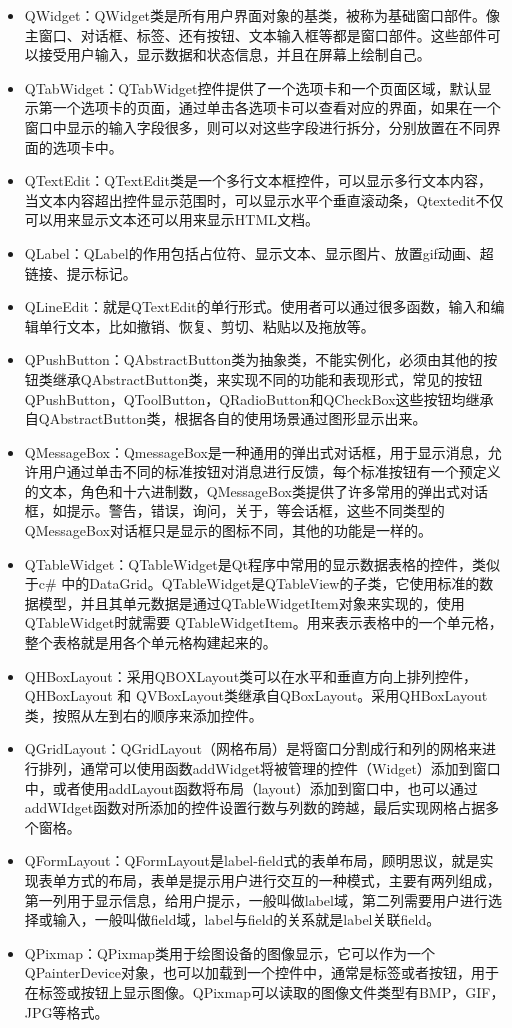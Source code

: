 \documentclass[cn,11pt,chinese]{elegantbook}
\begin{document}
\begin{itemize}
\item QWidget：QWidget类是所有用户界面对象的基类，被称为基础窗口部件。像主窗口、对话框、标签、还有按钮、文本输入框等都是窗口部件。这些部件可以接受用户输入，显示数据和状态信息，并且在屏幕上绘制自己。
\item QTabWidget：QTabWidget控件提供了一个选项卡和一个页面区域，默认显示第一个选项卡的页面，通过单击各选项卡可以查看对应的界面，如果在一个窗口中显示的输入字段很多，则可以对这些字段进行拆分，分别放置在不同界面的选项卡中。
\item QTextEdit：QTextEdit类是一个多行文本框控件，可以显示多行文本内容，当文本内容超出控件显示范围时，可以显示水平个垂直滚动条，Qtextedit不仅可以用来显示文本还可以用来显示HTML文档。
\item QLabel：QLabel的作用包括占位符、显示文本、显示图片、放置gif动画、超链接、提示标记。
\item QLineEdit：就是QTextEdit的单行形式。使用者可以通过很多函数，输入和编辑单行文本，比如撤销、恢复、剪切、粘贴以及拖放等。
\item QPushButton：QAbstractButton类为抽象类，不能实例化，必须由其他的按钮类继承QAbstractButton类，来实现不同的功能和表现形式，常见的按钮QPushButton，QToolButton，QRadioButton和QCheckBox这些按钮均继承自QAbstractButton类，根据各自的使用场景通过图形显示出来。
\item QMessageBox：QmessageBox是一种通用的弹出式对话框，用于显示消息，允许用户通过单击不同的标准按钮对消息进行反馈，每个标准按钮有一个预定义的文本，角色和十六进制数，QMessageBox类提供了许多常用的弹出式对话框，如提示。警告，错误，询问，关于，等会话框，这些不同类型的QMessageBox对话框只是显示的图标不同，其他的功能是一样的。
\item QTableWidget：QTableWidget是Qt程序中常用的显示数据表格的控件，类似于c\# 中的DataGrid。QTableWidget是QTableView的子类，它使用标准的数据模型，并且其单元数据是通过QTableWidgetItem对象来实现的，使用QTableWidget时就需要 QTableWidgetItem。用来表示表格中的一个单元格，整个表格就是用各个单元格构建起来的。
\item QHBoxLayout：采用QBOXLayout类可以在水平和垂直方向上排列控件，QHBoxLayout 和 QVBoxLayout类继承自QBoxLayout。采用QHBoxLayout类，按照从左到右的顺序来添加控件。
\item QGridLayout：QGridLayout（网格布局）是将窗口分割成行和列的网格来进行排列，通常可以使用函数addWidget将被管理的控件（Widget）添加到窗口中，或者使用addLayout函数将布局（layout）添加到窗口中，也可以通过addWIdget函数对所添加的控件设置行数与列数的跨越，最后实现网格占据多个窗格。
\item QFormLayout：QFormLayout是label-field式的表单布局，顾明思议，就是实现表单方式的布局，表单是提示用户进行交互的一种模式，主要有两列组成，第一列用于显示信息，给用户提示，一般叫做label域，第二列需要用户进行选择或输入，一般叫做field域，label与field的关系就是label关联field。
\item QPixmap：QPixmap类用于绘图设备的图像显示，它可以作为一个QPainterDevice对象，也可以加载到一个控件中，通常是标签或者按钮，用于在标签或按钮上显示图像。QPixmap可以读取的图像文件类型有BMP，GIF，JPG等格式。
\end{itemize}
~\\
\end{document}

